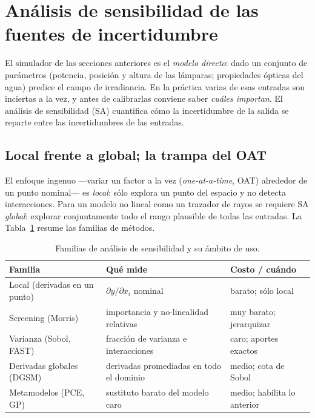 
\section{Análisis de sensibilidad de las fuentes de incertidumbre}\label{sec:sensibilidad}

El simulador de las secciones anteriores es el \emph{modelo directo}: dado un
conjunto de parámetros (potencia, posición y altura de las lámparas; propiedades
ópticas del agua) predice el campo de irradiancia. En la práctica varias de esas
entradas son inciertas a la vez, y antes de calibrarlas conviene saber
\emph{cuáles importan}. El análisis de sensibilidad (SA) cuantifica cómo la
incertidumbre de la salida se reparte entre las incertidumbres de las entradas.

\subsection{Local frente a global; la trampa del OAT}

El enfoque ingenuo —variar un factor a la vez (\emph{one-at-a-time}, OAT) alrededor
de un punto nominal— es \emph{local}: sólo explora un punto del espacio y no detecta
interacciones. Para un modelo no lineal como un trazador de rayos se requiere SA
\emph{global}: explorar conjuntamente todo el rango plausible de todas las entradas.
La Tabla~\ref{tab:sataxonomia} resume las familias de métodos.

\begin{table}[h]
\centering
\caption{Familias de análisis de sensibilidad y su ámbito de uso.}
\label{tab:sataxonomia}
\small
\begin{tabular}{lll}
\toprule
Familia & Qué mide & Costo / cuándo \\
\midrule
Local (derivadas en un punto) & $\partial y/\partial x_i$ nominal & barato; sólo local \\
Screening (Morris) & importancia y no-linealidad relativas & muy barato; jerarquizar \\
Varianza (Sobol, FAST) & fracción de varianza e interacciones & caro; aportes exactos \\
Derivadas globales (DGSM) & derivadas promediadas en todo el dominio & medio; cota de Sobol \\
Metamodelos (PCE, GP) & sustituto barato del modelo caro & medio; habilita lo anterior \\
\bottomrule
\end{tabular}
\end{table}

